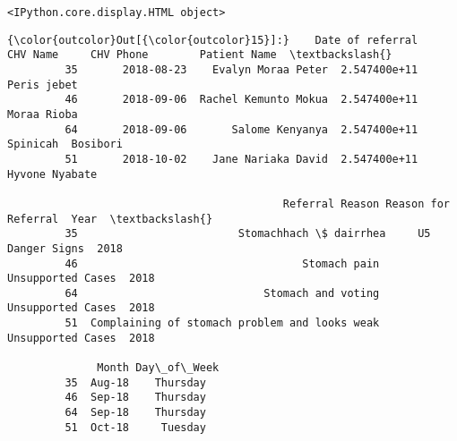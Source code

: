 \documentclass[11pt]{article}
\begin{document}
    
    \begin{verbatim}
<IPython.core.display.HTML object>
    \end{verbatim}

    
\begin{Verbatim}[commandchars=\\\{\}]
{\color{outcolor}Out[{\color{outcolor}15}]:}    Date of referral              CHV Name     CHV Phone        Patient Name  \textbackslash{}
         35       2018-08-23    Evalyn Moraa Peter  2.547400e+11         Peris jebet   
         46       2018-09-06  Rachel Kemunto Mokua  2.547400e+11         Moraa Rioba   
         64       2018-09-06       Salome Kenyanya  2.547400e+11  Spinicah  Bosibori   
         51       2018-10-02    Jane Nariaka David  2.547400e+11      Hyvone Nyabate   
         
                                           Referral Reason Reason for Referral  Year  \textbackslash{}
         35                         Stomachhach \$ dairrhea     U5 Danger Signs  2018   
         46                                   Stomach pain   Unsupported Cases  2018   
         64                             Stomach and voting   Unsupported Cases  2018   
         51  Complaining of stomach problem and looks weak   Unsupported Cases  2018   
         
              Month Day\_of\_Week  
         35  Aug-18    Thursday  
         46  Sep-18    Thursday  
         64  Sep-18    Thursday  
         51  Oct-18     Tuesday  
\end{Verbatim}
            

    
    
    
    
\end{document}
